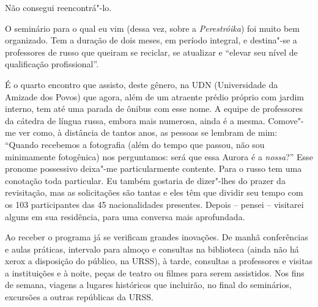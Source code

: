Não consegui reencontrá"-lo.

O seminário para o qual eu vim (dessa vez, sobre a \emph{Perestróika})
foi muito bem organizado. Tem a duração de dois meses, em período
integral, e destina"-se a professores de russo que queiram se reciclar,
se atualizar e ``elevar seu nível de qualificação profissional''.

É o quarto encontro que assisto, deste gênero, na UDN (Universidade da
Amizade dos Povos) que agora, além de um atraente prédio próprio com
jardim interno, tem até uma parada de ônibus com esse nome. A equipe de
professores da cátedra de língua russa, embora mais numerosa, ainda é a
mesma. Comove"-me ver como, à distância de tantos anos, as pessoas se
lembram de mim: ``Quando recebemos a fotografia (além do tempo que
passou, não sou minimamente fotogênica) nos perguntamos: será que essa
Aurora é a \emph{nossa}?'' Esse pronome possessivo deixa"-me
particularmente contente. Para o russo tem uma conotação toda
particular. Eu também gostaria de dizer"-lhes do prazer da revisitação,
mas as solicitações são tantas e eles têm que dividir seu tempo com os
103 participantes das 45 nacionalidades presentes. Depois -- pensei --
visitarei alguns em sua residência, para uma conversa mais aprofundada.

Ao receber o programa já se verificam grandes inovações. De manhã
conferências e aulas práticas, intervalo para almoço e consultas na
biblioteca (ainda não há xerox a disposição do público, na URSS), à
tarde, consultas a professores e visitas a instituições e à noite, peças
de teatro ou filmes para serem assistidos. Nos fins de semana, viagens a
lugares históricos que incluirão, no final do seminários, excursões a
outras repúblicas da URSS.

